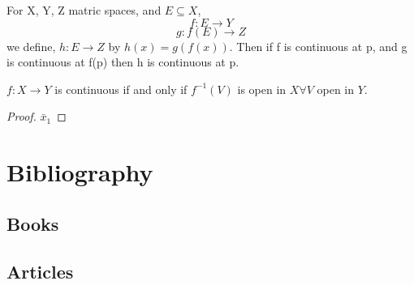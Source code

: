 \documentclass[11pt,fleqn]{book} %
\begin{document}
\begin{theorem}
	For X, Y, Z matric spaces, and $E \subseteq X$, 
	$$f: E \rightarrow Y$$
	$$g: f(E) \rightarrow Z$$
	we define, 
	$h: E \rightarrow Z$ by $h(x) = g(f(x))$.
	Then if f is continuous at p, and g is continuous at f(p) then h is continuous at p.
\end{theorem}

\begin{theorem}
	$f: X \rightarrow Y$ is continuous if and only if $f^{-1}(V)$ is open in $X \forall V$ open in $Y$.
\end{theorem}

\begin{proof}
	$\bar { x } _{ 1 }$
\end{proof}



\chapter*{Bibliography}
\section*{Books}
\printbibliography[heading=bibempty,type=book]
\section*{Articles}
\printbibliography[heading=bibempty,type=article]


\cleardoublepage
{}
\setlength{\columnsep}{0.75cm}
\printindex

\end{document}
